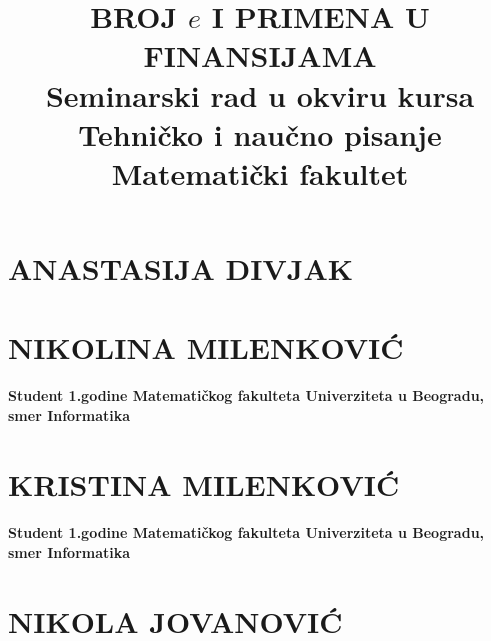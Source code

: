 \documentclass{article}
\title{BROJ $e$ I PRIMENA U FINANSIJAMA\\\large{Seminarski rad u okviru kursa}\\\large{Tehničko i naučno pisanje}\\ \large{Matematički fakultet}}
\author{}
\begin{document}
\maketitle

\begin{center}
    

\section*{\large{ANASTASIJA DIVJAK}}

\paragraph{}

\section*{\large{NIKOLINA MILENKOVIĆ}}

\paragraph{\normalfont Student 1.godine Matematičkog fakulteta Univerziteta u Beogradu, smer Informatika}

\section*{\large{KRISTINA MILENKOVIĆ}}

\paragraph{\normalfont Student 1.godine Matematičkog fakulteta Univerziteta u Beogradu, smer Informatika}

\section*{\large{NIKOLA JOVANOVIĆ}}


\paragraph{}



\paragraph{\\}
\end{center}
\end{document}
